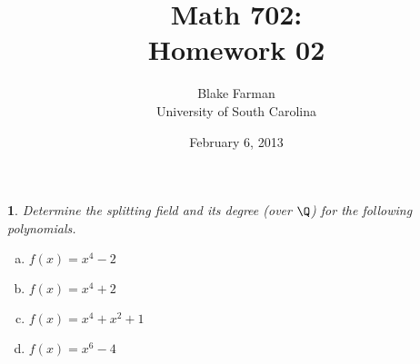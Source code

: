 \documentclass[10pt]{amsart}
\author{Blake Farman\\University of South Carolina}
\title{Math 702:\\Homework 02}
\date{February 6, 2013}
\begin{document}
\maketitle

\providecommand{\p}{\mathfrak{p}}
\providecommand{\m}{\mathfrak{m}}

\newtheorem{thm}{}
\newtheorem{lem}{Lemma}

\newcommand{\End}[2]{\operatorname{End}_{#1}\left(#2\right)}
\newcommand{\Hom}[2]{\operatorname{Hom}_{#1}\left(#2\right)}

\begin{thm}
  Determine the splitting field and its degree (over $\Q$) for the following polynomials.
  \begin{enumerate}[(a)]
  \item
    $f(x) = x^4 - 2$
  \item
    $f(x) = x^4 + 2$
  \item
    $f(x) = x^4 + x^2 + 1$
  \item
    $f(x) = x^6 - 4$
  \end{enumerate}
  

\end{thm}
\end{document}
